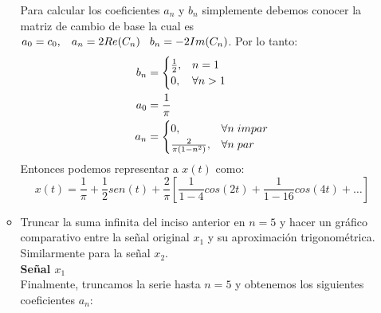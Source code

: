 \documentclass[12pt,a4paper]{report}
\begin{document}
\begin{enumerate}[label=\alph*),left=0pt]
\begin{itemize}[left=0pt]
        Para calcular los coeficientes $a_n$ y $b_n$ simplemente debemos conocer la matriz de cambio de base la cual es $a_0=c_0,\hspace{0.3cm}a_n=2Re(C_n)\hspace{0.3cm}b_n=-2Im(C_n)$.
        Por lo tanto:
        $$
        \begin{aligned}
            b_n&=\begin{cases}
            \frac{1}{2},& n=1\\
            0, & \forall n >1
        \end{cases}\\
        a_0&=\frac{1}{\pi}\\
        a_n&=\begin{cases}
            0,&\forall n \hspace{0.1cm}impar\\
            \frac{2}{\pi(1-n^2)},& \forall n \hspace{0.1cm} par
        \end{cases}\\  
        \end{aligned}
        $$
        Entonces podemos representar a $x(t)$ como:
        $$
        x(t)=\frac{1}{\pi}+\frac{1}{2}sen(t)+\frac{2}{\pi}[\frac{1}{1-4}cos(2t)+\frac{1}{1-16}cos(4t)+\dots]
        $$


   \item Truncar la suma infinita del inciso anterior en $n = 5$ y hacer un gráfico comparativo entre la señal 
     original $x_1$ y su aproximación trigonométrica. Similarmente para la señal $x_2$.\\

\textbf{Señal $x_1$}\\
     Finalmente, truncamos la serie hasta \(n = 5\) y obtenemos los siguientes coeficientes \(a_n\):
 


\end{itemize}
\end{enumerate}
\end{document}
